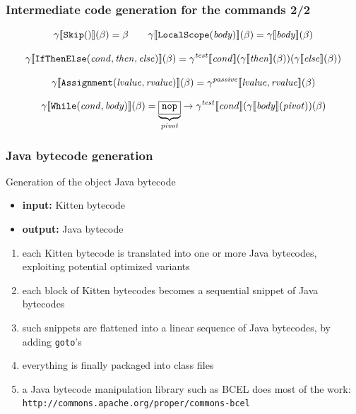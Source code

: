 \documentclass[11pt]{beamer}  %
\begin{document}
\begin{frame}
\frametitle{Intermediate code generation for the commands 2/2}

\[
  \gamma[\![{\mathtt{Skip()}}]\!](\beta)=\beta\qquad
    \gamma[\![{\mathtt{LocalScope(\mathit{body})}}]\!](\beta)=
    \gamma[\![{\mathit{body}}]\!](\beta)
\]

\[
   \gen{\mathtt{IfThenElse(\mathit{cond},\mathit{then},\mathit{else})}}
    (\beta)=\gentwo{\mathit{test}}{\mathit{cond}}
      (\gen{\mathit{then}}(\beta))(\gen{\mathit{else}}(\beta))
\]

\[
  \gamma[\![{\mathtt{Assignment(\mathit{lvalue},\mathit{rvalue})}}]\!](\beta)=
    \gamma^\mathit{passive}[\![{\mathit{lvalue},\mathit{rvalue}}]\!](\beta)
\]

\[
  \gamma[\![{\mathtt{While(\mathit{cond},\mathit{body})}}]\!](\beta)=
    \underbrace{\fbox{$\mathtt{nop}$}}_\mathit{pivot}
    \to\gamma^{\mathit{test}}[\![{\mathit{cond}}]\!](\gamma[\![{\mathit{body}}]\!](\mathit{pivot}))
    (\beta)
\]

\end{frame}

\begin{frame}
\frametitle{Java bytecode generation}

\begin{center}
\begin{redbox}{Generation of the object Java bytecode}
\begin{itemize}
\item \textbf{input:} Kitten bytecode
\item \textbf{output:} Java bytecode
\end{itemize}
\end{redbox}
\end{center}

\begin{pinkbox}{}
\begin{enumerate}
\item each Kitten bytecode is translated into one or more Java bytecodes,
      exploiting potential optimized variants
\item each block of Kitten bytecodes becomes a sequential snippet of Java bytecodes
\item such snippets are flattened into a linear sequence of Java bytecodes, by adding
      \texttt{goto}'s
\item everything is finally packaged into class files
\item a Java bytecode manipulation library such as BCEL does most of the work:
      \texttt{http://commons.apache.org/proper/commons-bcel}
\end{enumerate}
\end{pinkbox}

\end{frame}
\end{document}
